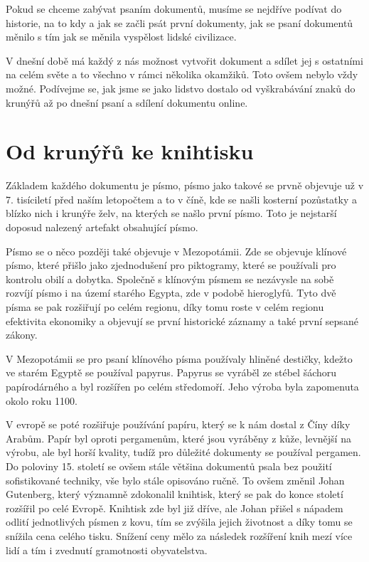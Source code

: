 Pokud se chceme zabývat psaním dokumentů, musíme se nejdříve podívat do historie, na to kdy a jak se začli psát první dokumenty, jak se psaní dokumentů
měnilo s tím jak se měnila vyspělost lidské civilizace.

V dnešní době má každý z nás možnost vytvořit dokument a sdílet jej s ostatními na celém světe a to všechno v rámci několika okamžiků. Toto ovšem nebylo
vždy možné. Podívejme se, jak jsme se jako lidstvo dostalo od vyškrabávání znaků do krunýřů až po dnešní psaní a sdílení dokumentu online.

\section{Od krunýřů ke knihtisku}

Základem každého dokumentu je písmo, písmo jako takové se prvně objevuje už v 7. tisíciletí před naším letopočtem a to v číně,
kde se našli kosterní pozůstatky a blízko nich i krunýře želv, na kterých se našlo první písmo. \cite{EarliestWriting} Toto je nejstarší doposud
nalezený artefakt obsahující písmo.

Písmo se o něco později také objevuje v Mezopotámii. Zde se objevuje klínové písmo, které přišlo jako zjednodušení pro piktogramy, které se používali
pro kontrolu obilí a dobytka. Společně s klínovým písmem se nezávysle na sobě rozvíjí písmo i na území starého Egypta, zde v podobě hieroglyfů. Tyto dvě
písma se pak rozšiřují po celém regionu, díky tomu roste v celém regionu efektivita ekonomiky a objevují se první historické záznamy
\cite{MesopotamiaHistory} a také první sepsané zákony.

V Mezopotámii se pro psaní klínového písma používaly hliněné destičky, kdežto ve starém Egyptě se používal papyrus. Papyrus se vyráběl ze stébel šáchoru
papírodárného a byl rozšířen po celém středomoří. Jeho výroba byla zapomenuta okolo roku 1100.

V evropě se poté rozšiřuje používání papíru, který se k nám dostal z Číny díky Arabům. Papír byl oproti pergamenům, které jsou vyráběny z kůže, levnější
na výrobu, ale byl horší kvality, tudíž pro důležité dokumenty se používal pergamen. Do poloviny 15. století se ovšem stále většina dokumentů psala bez
použití sofistikované techniky, vše bylo stále opisováno ručně. To ovšem změnil Johan Gutenberg, který významně zdokonalil knihtisk, který se pak do
konce století rozšířil po celé Evropě. Knihtisk zde byl již dříve, ale Johan přišel s nápadem odlití jednotlivých písmen z kovu, tím se zvýšila
jejich životnost a díky tomu se snížila cena celého tisku. Snížení ceny mělo za následek rozšíření knih mezí více lidí a tím i zvednutí gramotnosti
obyvatelstva. \cite{ucebnice1}

